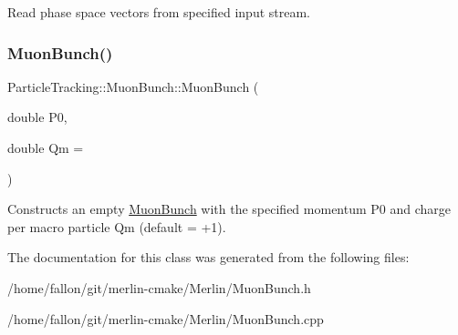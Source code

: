 Read phase space vectors from specified input stream. \mbox{\label{classParticleTracking_1_1MuonBunch_a8a063042340c07694f0ccc18703e1f99}} 
\subsubsection{\texorpdfstring{Muon\+Bunch()}{MuonBunch()}\hspace{0.1cm}{\footnotesize\ttfamily [3/3]}}
{\footnotesize\ttfamily Particle\+Tracking\+::\+Muon\+Bunch\+::\+Muon\+Bunch (\begin{DoxyParamCaption}\item[{double}]{P0,  }\item[{double}]{Qm = {} }\end{DoxyParamCaption})\hspace{0.3cm}{\ttfamily [inline]}}

Constructs an empty \hyperlink{classParticleTracking_1_1MuonBunch}{Muon\+Bunch} with the specified momentum P0 and charge per macro particle Qm (default = +1). 

The documentation for this class was generated from the following files\+:\begin{DoxyCompactItemize}
\item 
/home/fallon/git/merlin-\/cmake/\+Merlin/Muon\+Bunch.\+h\item 
/home/fallon/git/merlin-\/cmake/\+Merlin/Muon\+Bunch.\+cpp\end{DoxyCompactItemize}
